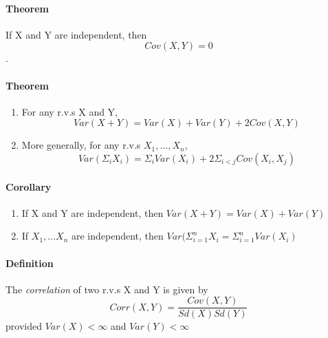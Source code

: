\documentclass[11pt]{article}
\newcommand{\ti}[1]{\textit{#1}}
\begin{document}
\paragraph{Theorem} If X and Y are independent, then $$Cov(X,Y) = 0$$.
\paragraph{Theorem} 
\begin{enumerate}
\item For any r.v.s X and Y,
$$Var(X+Y) = Var(X) + Var(Y) + 2Cov(X,Y)$$
\item More generally, for any r.v.s $X_1,...,X_n$,$$Var(\Sigma_i X_i) = \Sigma_i Var(X_i) + 2\Sigma_{i < j}Cov(X_i,X_j)$$
\end{enumerate}
\paragraph{Corollary}
\begin{enumerate}
	\item If X and Y are independent, then $Var(X+Y) = Var(X) + Var(Y)$
	\item If $X_1,...X_n$ are independent, then $Var(\Sigma_{i=1}^n X_i = \Sigma_{i=1}^nVar(X_i)$
\end{enumerate}
\paragraph{Definition} The \ti{correlation} of two r.v.s X and Y is given by
$$Corr(X,Y) = \frac{Cov(X,Y)}{Sd(X)Sd(Y)}$$ 
provided $Var(X) < \infty$ and $Var(Y) < \infty$
\end{document}
